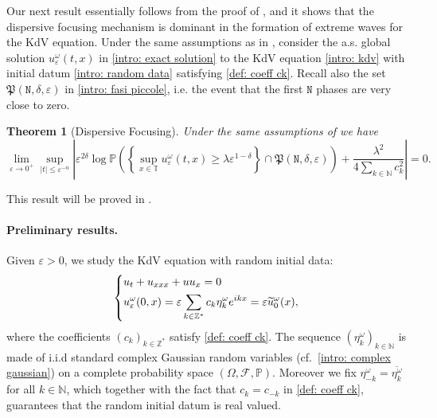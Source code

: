 \documentclass[a4paper,10pt,reqno]{article}
\theoremstyle{definition}
\theoremstyle{plain}
\newtheorem{theorem}[definition]{Theorem}
\theoremstyle{plain}
\theoremstyle{definition}
\theoremstyle{plain}
\theoremstyle{plain}
\theoremstyle{plain}
\theoremstyle{definition}
\theoremstyle{definition}
\def \N{\mathbb N}
\def \Z{\mathbb Z}
\def \P{{\mathbb P}}
\def \T{\mathbb{T}}
\def \tN{\mathtt{N}}
\begin{document}
\smallskip

Our next result essentially follows from the proof of , and it shows that the dispersive focusing mechanism is dominant in the formation of extreme waves for the KdV equation.
Under the same assumptions as in , consider the a.s. global solution $u_{\varepsilon}^{\omega}(t,x)$ in \eqref{intro: exact solution} to the KdV equation \eqref{intro: kdv} with initial datum \eqref{intro: random data} satisfying \eqref{def: coeff ck}.
Recall also the set $\mathfrak{P}(\tN,\delta,\varepsilon)$ in \eqref{intro: fasi piccole}, i.e. the event that the first $\tN$ phases are very close to zero. 

\begin{theorem}[Dispersive Focusing] \label{thm: dispersive focusing}
Under the same assumptions of  we have 
\begin{equation} \label{eq: dispersive focusing}
\lim_{\varepsilon\to 0^{+}} \sup_{|t|\leq \varepsilon^{-n}} \left \lvert \varepsilon^{2\delta} \log \P \left( \left \{ \sup_{x \in \T} u_{\varepsilon}^{\omega}(t,x) \ge \lambda \varepsilon^{1-\delta} \right \} \cap \mathfrak{P}(\tN,\delta,\varepsilon) \right) + \frac{\lambda^2}{4 \sum_{k\in\N} c_k^2} \right \rvert =0.
\end{equation}
\end{theorem}
\noindent This result will be proved in .

\paragraph{Preliminary results.} 
Given $\varepsilon > 0$, we study the KdV equation with random initial data:
\begin{equation}
\begin{dcases}
u_t + u_{xxx} + uu_x = 0 \\
u_{\varepsilon}^{\omega}(0,x) = \varepsilon \sum_{k \in \Z^*} c_k \eta_k^{\omega} e^{ikx} = \varepsilon \widetilde{u}_0^{\omega}(x),
\end{dcases}
\label{def: pdc con random iv (preliminari)}
\end{equation}
where the coefficients $(c_k)_{k \in \Z^*}$ satisfy \eqref{def: coeff ck}. 
The sequence $(\eta_k^{\omega})_{k \in \N}$ is made of i.i.d standard complex Gaussian random variables (cf.~\eqref{intro: complex gaussian}) on a complete probability space $(\mathbb{\Omega}, \mathcal{F}, \P)$. 
Moreover we fix $\eta_{-k}^{\omega} = \overline{\eta_k^{\omega}}$ for all $k\in\N$, which together with the fact that $c_k=c_{-k}$ in \eqref{def: coeff ck}, guarantees that the random initial datum is real valued.
\end{document}
